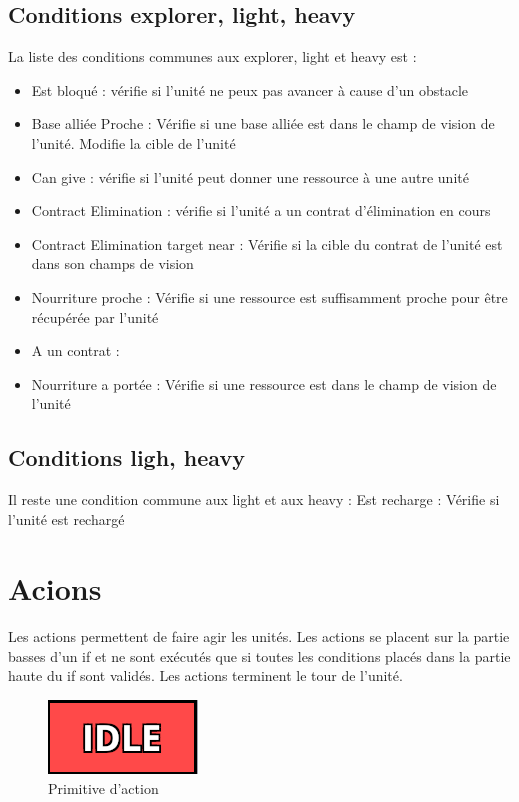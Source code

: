 \documentclass{report}
\begin{document}
\subsection{Conditions explorer, light, heavy}
La liste des conditions communes aux explorer, light et heavy est :
\begin{itemize}
\item Est bloqué : vérifie si l'unité ne peux pas avancer à cause d'un obstacle
\item Base alliée Proche : Vérifie si une base alliée est dans le champ de vision de l'unité. Modifie la cible de l'unité
\item Can give : vérifie si l'unité peut donner une ressource à une autre unité
\item Contract Elimination : vérifie si l'unité a un contrat d'élimination en cours
\item Contract Elimination target near : Vérifie si la cible du contrat de l'unité est dans son champs de vision
\item Nourriture proche : Vérifie si une ressource est suffisamment proche pour être récupérée par l'unité
\item A un contrat : 
\item Nourriture a portée : Vérifie si une ressource est dans le champ de vision de l'unité
\end{itemize}
\subsection{Conditions ligh, heavy}
Il reste une condition commune aux light et aux heavy : \newline
Est recharge : Vérifie si l'unité est rechargé
\section{Acions}
\paragraph{}
Les actions permettent de faire agir les unités. Les actions se placent sur la partie basses d'un if et ne sont exécutés que si toutes les conditions placés dans la partie haute du if sont validés. Les actions terminent le tour de l'unité.
\begin{figure}[!h]
	\centering
		\includegraphics[scale=1]{action.png}
	\caption{Primitive d'action}
\end{figure}
\end{document}
